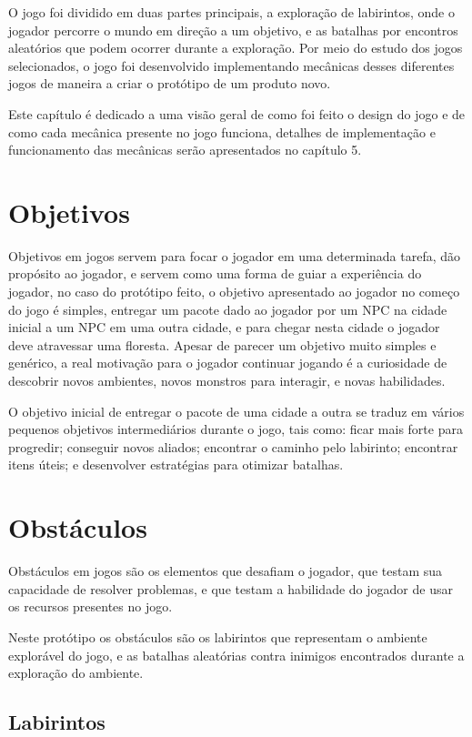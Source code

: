 \documentclass[
	12pt,				%
	openright,			%
	twoside,			%
	a4paper,			%
	english,			%
	french,				%
	spanish,			%
	brazil				%
	]{abntex2}
\begin{document}
O jogo foi dividido em duas partes principais, a exploração de labirintos, onde o jogador percorre o mundo em direção a um objetivo, e as batalhas por encontros aleatórios que podem ocorrer durante a exploração. Por meio do estudo dos jogos selecionados, o jogo foi desenvolvido implementando mecânicas desses diferentes jogos de maneira a criar o protótipo de um produto novo.

	Este capítulo é dedicado a uma visão geral de como foi feito o design do jogo e de como cada mecânica presente no jogo funciona, detalhes de implementação e funcionamento das mecânicas serão apresentados no capítulo 5.

\section{Objetivos}

Objetivos em jogos servem para focar o jogador em uma determinada tarefa, dão propósito ao jogador, e servem como uma forma de guiar a experiência do jogador, no caso do protótipo feito, o objetivo apresentado ao jogador no começo do jogo é simples, entregar um pacote dado ao jogador por um NPC na cidade inicial a um NPC em uma outra cidade, e para chegar nesta cidade o jogador deve atravessar uma floresta. Apesar de parecer um objetivo muito simples e genérico, a real motivação para o jogador continuar jogando é a curiosidade de descobrir novos ambientes, novos monstros para interagir, e novas habilidades.

	O objetivo inicial de entregar o pacote de uma cidade a outra se traduz em vários pequenos objetivos intermediários durante o jogo, tais como: ficar mais forte para progredir; conseguir novos aliados; encontrar o caminho pelo labirinto; encontrar itens úteis; e desenvolver estratégias para otimizar batalhas.

\section{Obstáculos}

Obstáculos em jogos são os elementos que desafiam o jogador, que testam sua capacidade de resolver problemas, e que testam a habilidade do jogador de usar os recursos presentes no jogo.

	Neste protótipo os obstáculos são os labirintos que representam o ambiente explorável do jogo, e as batalhas aleatórias contra inimigos encontrados durante a exploração do ambiente.

\subsection{Labirintos}
\end{document}
